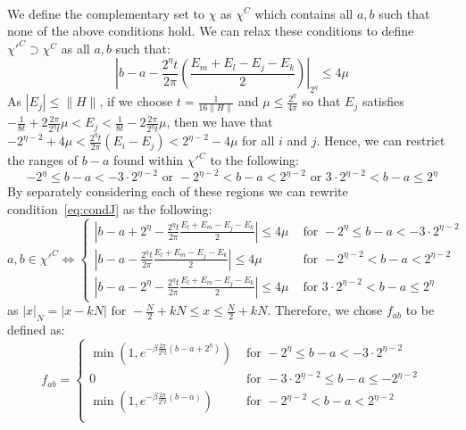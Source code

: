 \documentclass[aps,floatfix,10pt,amssymb,amsfont,amsmath,superscriptaddress,float,nofootinbib,longbibliography,nobalancelastpage,twocolumn]{revtex4-2}
\begin{document}
\begin{widetext}
\begin{equation}
\begin{aligned}
\end{aligned}
\end{equation}
We define the complementary set to $\chi$ as $\chi^C$ which contains all $a,b$ such that none of the above conditions hold. We can relax these conditions to define $\chi'^C \supset \chi^C$  as all $a,b$ such that:
\begin{equation}
\label{eq:condJ}
        |b-a -\frac{2^{\eta}t}{2\pi}(\frac{E_m+E_l-E_j-E_k}{2})|_{2^{\eta}} \leq 4\mu
\end{equation}
As $|E_j| \leq \|H\|$, if we choose $t = \frac{1}{16\|H\|}$ and $\mu \leq \frac{2^{\eta}}{4\pi}$ so that $E_j$ satisfies $-\frac{1}{8t} + 2\frac{2\pi}{2^{\eta}t}\mu < E_j < \frac{1}{8t} - 2\frac{2\pi}{2^{\eta}t}\mu$, then we have that $-2^{\eta-2}+4\mu < \frac{2^{\eta}t}{2\pi}(E_i -E_j) < 2^{\eta-2}-4\mu$ for all $i$ and $j$. Hence, we can restrict the ranges of $b-a$ found within $\chi'^C$ to the following:
\begin{equation}
    -2^{\eta}\leq b-a < -3\cdot2^{\eta-2} \text{ or }-2^{\eta-2}< b-a < 2^{\eta-2} \text{ or } 3\cdot2^{\eta-2}< b-a \leq 2^{\eta}
\end{equation}
By separately considering each of these regions we can rewrite condition~\eqref{eq:condJ} as the following:
\begin{equation}
    a,b \in \chi'^C \iff \begin{cases}
    |b-a+2^{\eta}-\frac{2^{\eta}t}{2\pi}\frac{E_l+E_m-E_j-E_k}{2}|\leq 4\mu&\text{ for }-2^{\eta}\leq b-a < -3\cdot2^{\eta-2}\\
     |b-a-\frac{2^{\eta}t}{2\pi}\frac{E_l+E_m-E_j-E_k}{2}|\leq 4\mu&\text{ for }-2^{\eta-2}< b-a < 2^{\eta-2}\\
     |b-a-2^{\eta}-\frac{2^{\eta}t}{2\pi}\frac{E_l+E_m-E_j-E_k}{2}|\leq 4\mu&\text{ for }3\cdot 2^{\eta-2}< b-a \leq 2^{\eta}
    \end{cases}
    \label{eq:conditions}
\end{equation}
as $|x|_N = |x - kN| \text{ for } -\frac{N}{2} + kN \leq x \leq \frac{N}{2} + kN$.
Therefore, we chose $f_{ab}$ to be defined as:
\begin{equation}
    f_{ab} = \begin{cases}
    \min(1,e^{-\beta\frac{2\pi}{2^{\eta}t}(b-a+2^{\eta})})&\text{ for }-2^{\eta}\leq b-a < -3\cdot2^{\eta-2}\\
    0&\text{ for }-3\cdot2^{\eta-2}\leq b-a \leq -2^{\eta-2}\\
     \min(1,e^{-\beta\frac{2\pi}{2^{\eta}t}(b-a)})&\text{ for }-2^{\eta-2}< b-a < 2^{\eta-2}\\

\end{cases}
\end{equation}
\end{widetext}
\end{document}
